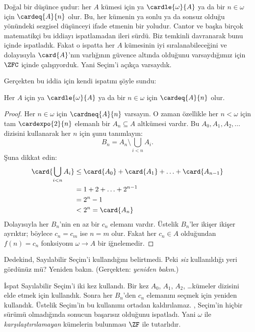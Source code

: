 \documentclass[../../../include/open-logic-section]{subfiles}
\begin{document}
\begin{ex}
Doğal bir düşünce şudur: her $A$ kümesi için ya $\cardle{\omega}{A}$ ya
da bir $n\in\omega$ için $\cardeq{A}{n}$ olur. Bu, her kümenin ya sonlu
ya da sonsuz olduğu yönündeki sezgisel düşünceyi ifade etmenin bir yoludur.
Cantor ve başka birçok matematikçi bu iddiayı ispatlamadan ileri sürdü.
Biz temkinli davranarak bunu
 içinde ispatladık.
Fakat o ispatta her $A$ kümesinin iyi sıralanabileceğini ve dolayısıyla
$\card{A}$'nın varlığının güvence altında olduğunu varsaydığımız için
$\ZFC$ içinde çalışıyorduk. Yani Seçim'i açıkça varsaydık.

Gerçekten \citet{Dedekind1888} bu iddia için kendi ispatını şöyle sundu:

\begin{thm}
Her $A$ için ya $\cardle{\omega}{A}$ ya da bir $n\in\omega$ için
$\cardeq{A}{n}$ olur.
\end{thm}

\begin{proof}
Her $n\in\omega$ için $\cardneq{A}{n}$ varsayın. O zaman özellikle her
$n<\omega$ için tam $\cardexpo{2}{n}$ elemanlı bir
$A_n\subseteq A$ altkümesi vardır. Bu $A_0,A_1,A_2,\ldots$ dizisini
kullanarak her $n$ için şunu tanımlayın:
\[
	B_n = A_n \setminus \bigcup_{i < n} A_i.
\]
Şuna dikkat edin:
\begin{align*}
	\card{\bigcup_{i < n}A_i}
	&\leq \card{A_0} + \card{A_1} + \ldots + \card{A_{n-1}}\\
	&=1 + 2 + \ldots + 2^{n-1}\\
	& = 2^n - 1\\
	& < 2^n = \card{A_n}
\end{align*}
Dolayısıyla her $B_n$'nin en az bir $c_n$ elemanı vardır. Üstelik
$B_n$'ler ikişer ikişer ayrıktır; böylece $c_n=c_m$ ise $n=m$ olur.
Fakat her $c_n\in A$ olduğundan $f(n)=c_n$ fonksiyonu
$\omega\to A$ bir iğnelemedir.
\end{proof}
\noindent
Dedekind, Sayılabilir Seçim'i kullandığını belirtmedi. Peki
\emph{siz} kullanıldığı yeri gördünüz mü? Yeniden bakın. (Gerçekten:
\emph{yeniden bakın}.)

İspat Sayılabilir Seçim'i iki kez kullandı. Bir kez
$A_0$, $A_1$, $A_2$, \dots\@ kümeler dizisini elde etmek için kullandık. Sonra her
$B_n$'den $c_n$ elemanını seçmek için yeniden kullandık. Üstelik Seçim'in
bu kullanımı ortadan kaldırılamaz. \citet[p.~138]{Cohen1966}, Seçim'in
hiçbir sürümü olmadığında sonucun başarısız olduğunu ispatladı. Yani
$\omega$ ile \emph{karşılaştırılamayan} kümelerin bulunması $\ZF$ ile
tutarlıdır.
\end{ex}
\end{document}
